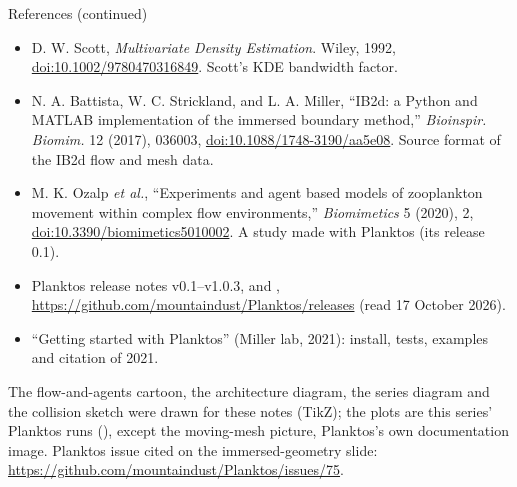 \documentclass[aspectratio=169,11pt]{beamer}
\begin{document}
\begin{frame}{References (continued)}
\footnotesize
\begin{itemize}\itemsep3pt
  \item D. W. Scott, \emph{Multivariate Density Estimation}. Wiley, 1992, \href{https://doi.org/10.1002/9780470316849}{doi:10.1002/9780470316849}. Scott's KDE bandwidth factor.
  \item N. A. Battista, W. C. Strickland, and L. A. Miller, ``IB2d: a Python and MATLAB implementation of the immersed boundary method,'' \emph{Bioinspir. Biomim.} 12 (2017), 036003, \href{https://doi.org/10.1088/1748-3190/aa5e08}{doi:10.1088/1748-3190/aa5e08}. Source format of the IB2d flow and mesh data.
  \item M. K. Ozalp \emph{et al.}, ``Experiments and agent based models of zooplankton movement within complex flow environments,'' \emph{Biomimetics} 5 (2020), 2, \href{https://doi.org/10.3390/biomimetics5010002}{doi:10.3390/biomimetics5010002}. A study made with Planktos (its release 0.1).
  \item Planktos release notes v0.1--v1.0.3,  and , \url{https://github.com/mountaindust/Planktos/releases} (read 17 October 2026).
  \item ``Getting started with Planktos'' (Miller lab, 2021): install, tests, examples and citation of 2021.
\end{itemize}
\begin{punchbox}
\footnotesize The flow-and-agents cartoon, the architecture diagram, the series diagram and the collision sketch were drawn for these notes (TikZ); the plots are this series' Planktos runs (), except the moving-mesh picture, Planktos's own documentation image. Planktos issue cited on the immersed-geometry slide: \url{https://github.com/mountaindust/Planktos/issues/75}.
\end{punchbox}
\end{frame}
\end{document}
